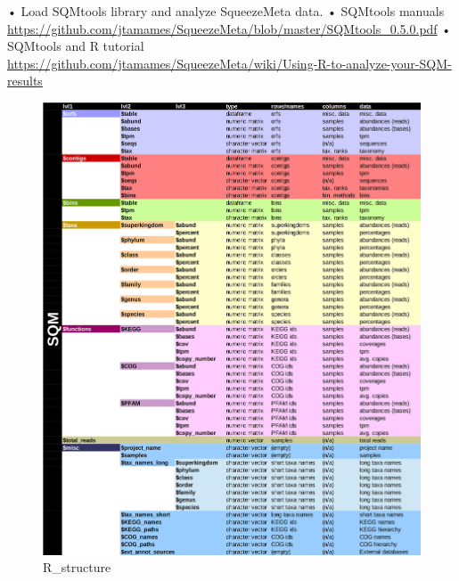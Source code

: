 \documentclass[
]{book}
\newenvironment{Shaded}{\begin{snugshade}}{\end{snugshade}}
\newcommand{\CommentTok}[1]{\textcolor[rgb]{0.56,0.35,0.01}{\textit{#1}}}
\newcommand{\FunctionTok}[1]{\textcolor[rgb]{0.00,0.00,0.00}{#1}}
\newcommand{\NormalTok}[1]{#1}
\newcommand{\OtherTok}[1]{\textcolor[rgb]{0.56,0.35,0.01}{#1}}
\newcommand{\StringTok}[1]{\textcolor[rgb]{0.31,0.60,0.02}{#1}}
\begin{document}
• Load SQMtools library and analyze SqueezeMeta data.
• SQMtools manuals \url{https://github.com/jtamames/SqueezeMeta/blob/master/SQMtools_0.5.0.pdf}
• SQMtools and R tutorial \url{https://github.com/jtamames/SqueezeMeta/wiki/Using-R-to-analyze-your-SQM-results}

\begin{Shaded}
\end{Shaded}

\begin{figure}
\centering
\includegraphics[width=1\textwidth,height=\textheight]{./Figures/R_structure.jpg}
\caption{R\_structure}
\end{figure}
\end{document}
